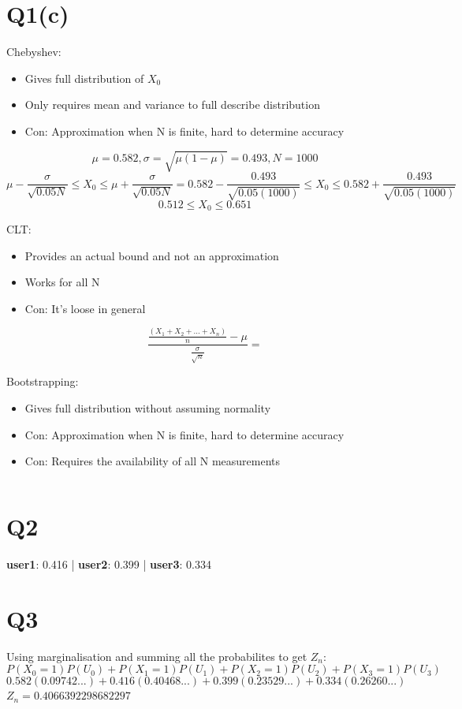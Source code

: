 \documentclass[a4paper,11pt]{article}
\theoremstyle{mytheor}
\begin{document}
\section*{Q1(c)} 
    Chebyshev: 
    \begin{itemize}
        \item Gives full distribution of $X_0$
        \item Only requires mean and variance to full describe distribution
        \item Con: Approximation when N is finite, hard to determine accuracy
    \end{itemize}
    $$ \mu = 0.582,  \sigma = \sqrt{\mu(1-\mu)} = 0.493, N=1000 $$
    $$ \mu - \frac{\sigma}{\sqrt{0.05N}} \leq X_0 \leq \mu + \frac{\sigma}{\sqrt{0.05N}} = 0.582 - \frac{0.493}{\sqrt{0.05(1000)}} \leq X_0 \leq 0.582 + \frac{0.493}{\sqrt{0.05(1000)}}$$ 
    $$ 0.512 \leq X_0 \leq 0.651 $$ 

    CLT:
    \begin{itemize}
        \item Provides an actual bound and not an approximation
        \item Works for all N
        \item Con: It's loose in general
    \end{itemize}
    $$ \frac{\frac{(X_1+X_2+...+X_n)}{n} - \mu}{\frac{\sigma}{\sqrt{n}}}  = $$

    Bootstrapping:
    \begin{itemize}
        \item Gives full distribution without assuming normality
        \item Con: Approximation when N is finite, hard to determine accuracy
        \item Con: Requires the availability of all N measurements
    \end{itemize}
    $$ $$
\section*{Q2}
    \textbf{user1}: 0.416 | \textbf{user2}: 0.399 | \textbf{user3}: 0.334


\section*{Q3}
    Using marginalisation and summing all the probabilites to get $Z_n$:
    $$ P(X_0 = 1)P(U_0) + P(X_1 = 1)P(U_1) + P(X_2 = 1)P(U_2) + P(X_3 = 1)P(U_3) $$
    $$ 0.582(0.09742...) + 0.416(0.40468...) + 0.399(0.23529...) + 0.334(0.26260...) $$
    $ Z_n = 0.4066392298682297 $
\end{document}
